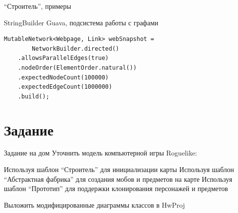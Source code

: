 \documentclass{../../slides-style}
\begin{document}
    \begin{frame}[fragile]{\enquote{Строитель}, примеры}
        \begin{outline}
            \1 StringBuilder
            \1 Guava, подсистема работы с графами
            \begin{verbatim}
MutableNetwork<Webpage, Link> webSnapshot = 
        NetworkBuilder.directed()
    .allowsParallelEdges(true)
    .nodeOrder(ElementOrder.natural())
    .expectedNodeCount(100000)
    .expectedEdgeCount(1000000)
    .build();
            \end{verbatim}
        \end{outline}
    \end{frame}

    \section{Задание}

    \begin{frame}{Задание на дом}
        Уточнить модель компьютерной игры Roguelike:

        \begin{outline}[enumerate]
            \1 Используя шаблон \enquote{Строитель} для инициализации карты
            \1 Используя шаблон \enquote{Абстрактная фабрика} для создания мобов и предметов на карте
            \1 Используя шаблон \enquote{Прототип} для поддержки клонирования персонажей и предметов
        \end{outline}

        Выложить модифицированные диаграммы классов в HwProj
    \end{frame}
\end{document}
